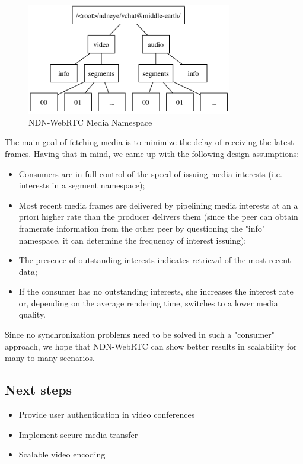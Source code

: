 \documentclass[12pt]{article}
\begin{document}
\begin{figure}
\centering
\includegraphics[width=0.8\textwidth]{../res/graphics/namespace-v01}
\caption{NDN-WebRTC Media Namespace}
\label{media-ns}
\end{figure}

The main goal of fetching media is to minimize the delay of receiving the latest frames. Having that in mind, we came up with the following design assumptions:

\begin{itemize}
\item Consumers are in full control of the speed of issuing media interests (i.e. interests in a segment namespace);
\item Most recent media frames are delivered by pipelining media interests at an a priori higher rate than the producer delivers them (since the peer can obtain framerate information from the other peer by questioning the "info" namespace, it can determine the frequency of interest issuing);
\item The presence of outstanding interests indicates retrieval of the most recent data;
\item If the consumer has no outstanding interests, she increases the interest rate or, depending on the average rendering time, switches to a lower media quality. 
\end{itemize} 

Since no synchronization problems need to be solved in such a "consumer" approach, we hope that NDN-WebRTC can show better results in scalability for many-to-many scenarios.

\subsection{Next steps}
\begin{itemize}
\item Provide user authentication in video conferences
\item Implement secure media transfer
\item Scalable video encoding
\end{itemize}
\end{document}
